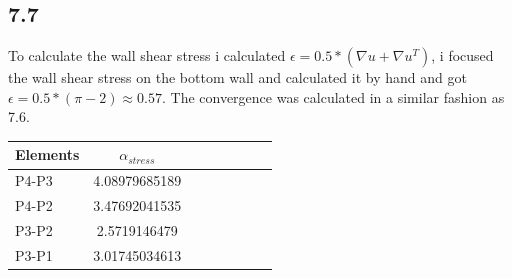 \documentclass[a4paper,norsk]{article}
\begin{document}
\subsection*{7.7}
To calculate the wall shear stress i calculated $\epsilon =  0.5*(\nabla u + \nabla u^T)$, i focused the wall shear stress on the bottom wall and calculated it by hand and got $\epsilon = 0.5*(\pi-2) \approx 0.57$. The convergence was calculated in a similar fashion as 7.6. \newline
\begin{tabular}{l*{6}{c}r}
Elements         & $\alpha_{stress}$   \\
\hline
P4-P3        &  4.08979685189  \\
P4-P2        &  3.47692041535  \\ 
P3-P2        &  2.5719146479 \\
P3-P1        &  3.01745034613 \\
\end{tabular}
\newline
\end{document}
